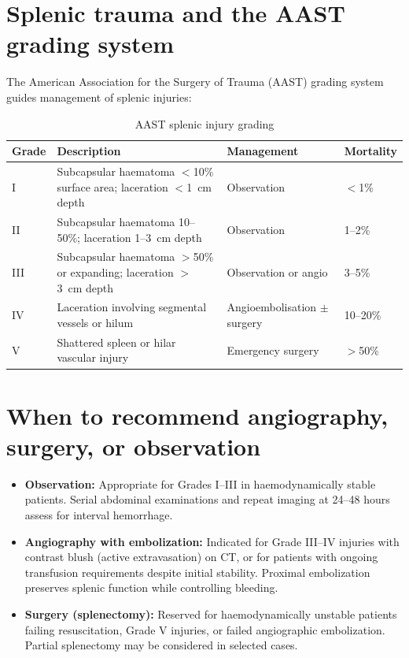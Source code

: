 \section{Splenic trauma and the AAST grading system}
The American Association for the Surgery of Trauma (AAST) grading system guides management of splenic injuries:

\begin{table}[h]
\centering
\caption{AAST splenic injury grading}
\label{tab:aast_spleen}
\begin{tabular}{@{}p{}p{}p{}p{}@{}}
\hline
\textbf{Grade} & \textbf{Description} & \textbf{Management} & \textbf{Mortality} \\
\hline
I & Subcapsular haematoma $<$10\% surface area; laceration $<$1~cm depth & Observation & $<$1\% \\
II & Subcapsular haematoma 10--50\%; laceration 1--3~cm depth & Observation & 1--2\% \\
III & Subcapsular haematoma $>$50\% or expanding; laceration $>$3~cm depth & Observation or angio & 3--5\% \\
IV & Laceration involving segmental vessels or hilum & Angioembolisation $\pm$ surgery & 10--20\% \\
V & Shattered spleen or hilar vascular injury & Emergency surgery & $>$50\% \\
\hline
\end{tabular}
\end{table}

\section{When to recommend angiography, surgery, or observation}
\begin{itemize}
    \item \textbf{Observation:} Appropriate for Grades I--III in haemodynamically stable patients. Serial abdominal examinations and repeat imaging at 24--48 hours assess for interval hemorrhage.
    \item \textbf{Angiography with embolization:} Indicated for Grade III--IV injuries with contrast blush (active extravasation) on CT, or for patients with ongoing transfusion requirements despite initial stability. Proximal embolization preserves splenic function while controlling bleeding.
    \item \textbf{Surgery (splenectomy):} Reserved for haemodynamically unstable patients failing resuscitation, Grade V injuries, or failed angiographic embolization. Partial splenectomy may be considered in selected cases.
\end{itemize}

